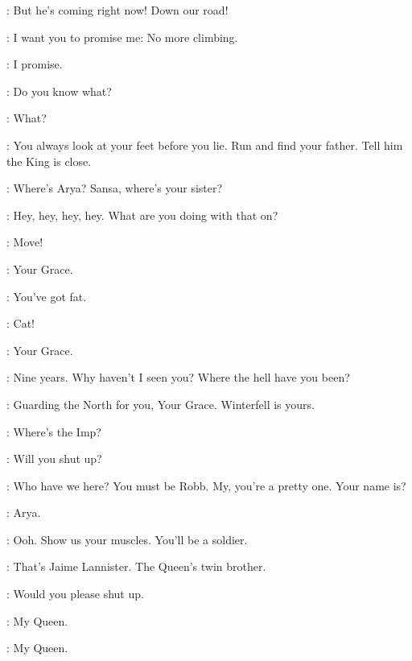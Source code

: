 \BRAN: But he's coming right now! Down our road! 

\CATELYN: I want you to promise me: No more climbing. 

\BRAN: I promise. 

\CATELYN: Do you know what? 

\BRAN: What? 

\CATELYN: You always look at your feet before you lie. Run and find your father. Tell him the King is close. 


\CATELYN: Where's Arya? Sansa, where's your sister? 


\NED: Hey, hey, hey, hey. What are you doing with that on?  

\ARYA:  Move! 


\NED: Your Grace. 

\ROBERT: You've got fat. 


\ROBERT: Cat! 

\CATELYN: Your Grace. 

\ROBERT: Nine years. Why haven't I seen you? Where the hell have you been? 

\NED: Guarding the North for you, Your Grace. Winterfell is yours. 

\ARYA: Where's the Imp? 

\SANSA: Will you shut up? 

\ROBERT: Who have we here? You must be Robb.  My, you're a pretty one.  Your name is? 

\ARYA: Arya. 

\ROBERT:   Ooh. Show us your muscles. You'll be a soldier. 


\ARYA: That's Jaime Lannister. The Queen's twin brother. 

\SANSA: Would you please shut up. 


\NED: My Queen. 

\CATELYN: My Queen. 

